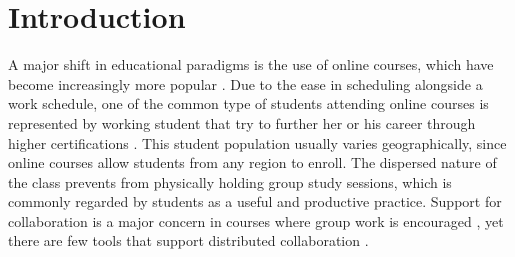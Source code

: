\documentclass{sig-alternate}
\begin{document}




%
% 
% 
% 
% 
% 
% 



\section{Introduction}
A major shift in educational paradigms is the use of online courses,
which have become increasingly more popular \cite{BELLER,DOE}.  Due to
the ease in scheduling alongside a work schedule, one of the common
type of students attending online courses is represented by working
student that try to further her or his career through higher
certifications \cite{BURGESS:TRENDS}.  This student population usually
varies geographically, since online courses allow students from any
region to enroll.  The dispersed nature of the class prevents 
from physically holding group study sessions, which is commonly regarded by students as
a useful and productive practice.  Support for collaboration is a major concern in
courses where group work is encouraged \cite{WELLS:COLLAB}, yet there
are few tools that support distributed collaboration
\cite{BURGESS:TRENDS}.
\end{document}
